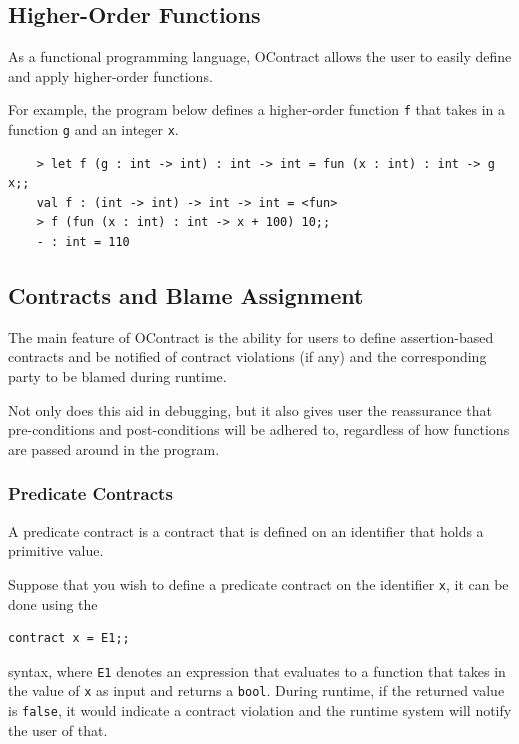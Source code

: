 \documentclass[a4paper]{article}
\begin{document}
\subsection{Higher-Order Functions}

As a functional programming language, OContract allows the user to easily define and apply higher-order functions.

For example, the program below defines a higher-order function \texttt{f} that takes in a function \texttt{g} and an integer \texttt{x}.

\begin{verbatim}
    > let f (g : int -> int) : int -> int = fun (x : int) : int -> g x;;
    val f : (int -> int) -> int -> int = <fun>
    > f (fun (x : int) : int -> x + 100) 10;;
    - : int = 110
\end{verbatim}

\subsection{Contracts and Blame Assignment}

The main feature of OContract is the ability for users to define assertion-based contracts and be notified of contract violations (if any) and the corresponding party to be blamed during runtime.

Not only does this aid in debugging, but it also gives user the reassurance that pre-conditions and post-conditions will be adhered to, regardless of how functions are passed around in the program.

\subsubsection{Predicate Contracts}

A predicate contract is a contract that is defined on an identifier that holds a primitive value.

Suppose that you wish to define a predicate contract on the identifier \texttt{x}, it can be done using the

\begin{verbatim}
contract x = E1;;
\end{verbatim}

syntax, where \texttt{E1} denotes an expression that evaluates to a function that takes in the value of \texttt{x} as input and returns a \texttt{bool}.
During runtime, if the returned value is \texttt{false}, it would indicate a contract violation and the runtime system will notify the user of that.
\end{document}
